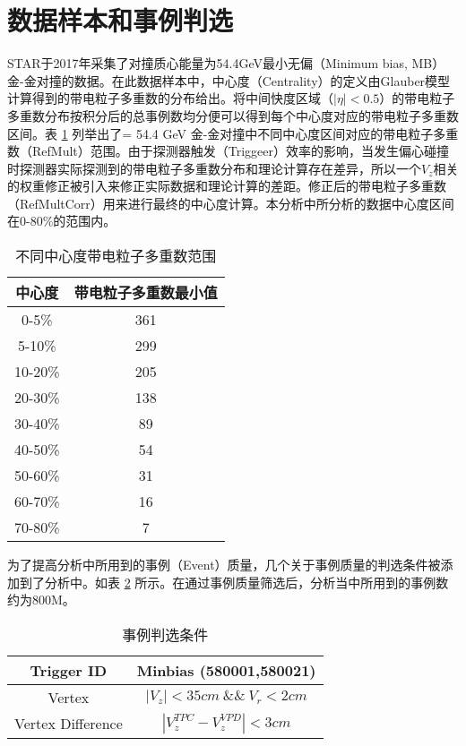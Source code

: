\section{数据样本和事例判选}
STAR于2017年采集了对撞质心能量为54.4GeV最小无偏（Minimum bias, MB）金-金对撞的数据。在此数据样本中，中心度（Centrality）的定义由Glauber模型计算得到的带电粒子多重数的分布给出。将中间快度区域（$|\eta| < 0.5 $）的带电粒子多重数分布按积分后的总事例数均分便可以得到每个中心度对应的带电粒子多重数区间。表 \ref{tab:centrality} 列举出了\sNN = 54.4 GeV 金-金对撞中不同中心度区间对应的带电粒子多重数（RefMult）范围。由于探测器触发（Triggeer）效率的影响，当发生偏心碰撞时探测器实际探测到的带电粒子多重数分布和理论计算存在差异，所以一个$V_z$相关的权重修正被引入来修正实际数据和理论计算的差距。修正后的带电粒子多重数（RefMultCorr）用来进行最终的中心度计算。本分析中所分析的数据中心度区间在0-80\%的范围内。

\begin{table}[h!]
    \centering
    \caption{不同中心度带电粒子多重数范围}
    \label{tab:centrality}
    \begin{tabular}{|c|c|}
    \hline
        中心度 & 带电粒子多重数最小值  \\
    \hline
         0-5\% & 361  \\
     \hline
         5-10\% & 299  \\
    \hline
         10-20\% & 205  \\
    \hline
         20-30\% & 138  \\
    \hline
         30-40\% & 89  \\
    \hline
         40-50\% & 54  \\
    \hline
         50-60\% & 31  \\
    \hline
         60-70\% & 16  \\
    \hline
         70-80\% & 7   \\     
    \hline
    \end{tabular}
\end{table}

为了提高分析中所用到的事例（Event）质量，几个关于事例质量的判选条件被添加到了分析中。如表 \ref{tab:EventSelection} 所示。在通过事例质量筛选后，分析当中所用到的事例数约为800M。

\begin{table}[h!]
    \centering
    \caption{事例判选条件}
    \label{tab:EventSelection}
    \begin{tabular}{|c|c|}
        \hline
        Trigger ID & Minbias (580001,580021)  \\
        \hline
        Vertex & $|V_z| < 35cm ~\&\&~ V_r < 2cm$   \\
        \hline
        Vertex Difference & $|V_{z}^{TPC} - V_{z}^{VPD}| < 3cm$\\
        \hline
    \end{tabular}
\end{table}
